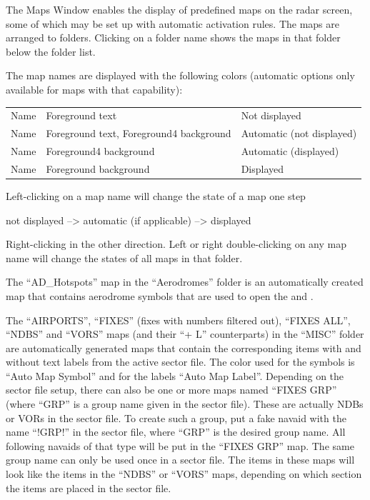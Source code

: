 \documentclass[11pt,a4paper,oldfontcommands]{memoir}
\begin{document}
The Maps Window enables the display of predefined maps on the radar screen, some of which may be set
up with automatic activation rules. The maps are arranged to folders. Clicking on a folder name shows the
maps in that folder below the folder list.

The map names are displayed with the following colors (automatic options only available for maps with
that capability):

\begin{tabular}{l l l}
    Name & Foreground text                          & Not displayed\\
    Name & Foreground text, Foreground4 background  & Automatic (not displayed)\\
    Name & Foreground4 background                   & Automatic (displayed)\\
    Name & Foreground background                    & Displayed\\    
\end{tabular}

Left-clicking on a map name will change the state of a map one step

not displayed --> automatic (if applicable) --> displayed

Right-clicking in the other direction. Left or right double-clicking on any map name will change the states of all maps in that folder.

The “AD\_Hotspots” map in the “Aerodromes” folder is an automatically created map that contains aerodrome symbols that are used to open the \textit{} and \textit{}.

The “AIRPORTS”, “FIXES” (fixes with numbers filtered out), “FIXES ALL”, “NDBS” and “VORS” maps (and their “+ L” counterparts) in the “MISC” folder are automatically generated maps that contain the corresponding items with and without text labels from the active sector file. The color used for the symbols is “Auto Map Symbol” and for the labels “Auto Map Label”. Depending on the sector file setup, there can also be one or more maps named “FIXES GRP” (where “GRP” is a group name given in the sector file). These are actually NDBs or VORs in the sector file. To create such a group, put a fake navaid with the name “!GRP!” in the sector file, where “GRP” is the desired group name. All following navaids of that type will be put in the “FIXES GRP” map. The same group name can only be used once in a sector file. The items in these maps will look like the items in the “NDBS” or “VORS” maps, depending on which section the items are placed in the sector file.
\end{document}
